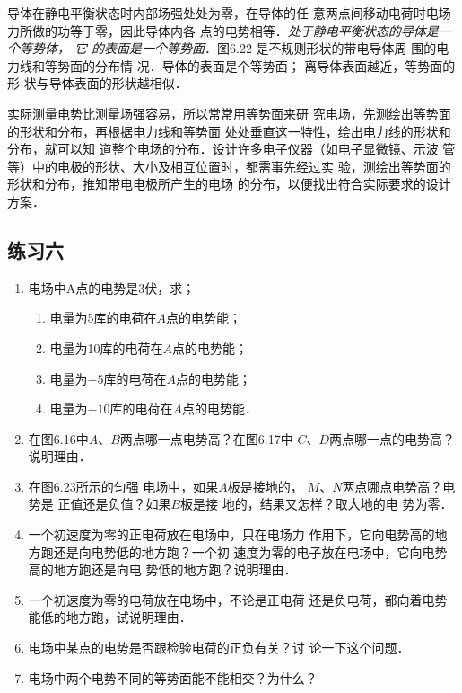 导体在静电平衡状态时内部场强处处为零，在导体的任
意两点间移动电荷时电场力所做的功等于零，因此导体内各
点的电势相等．\textit{处于静电平衡状态的导体是一个等势体，
它
的表面是一个等势面}．图6.22
是不规则形状的带电导体周
围的电力线和等势面的分布情
况．导体的表面是个等势面；
离导体表面越近，等势面的形
状与导体表面的形状越相似．

实际测量电势比测量场强容易，所以常常用等势面来研
究电场，先测绘出等势面的形状和分布，再根据电力线和等势面
处处垂直这一特性，绘出电力线的形状和分布，就可以知
道整个电场的分布．设计许多电子仪器（如电子显微镜、示波
管等）中的电极的形状、大小及相互位置时，都需事先经过实
验，测绘出等势面的形状和分布，推知带电电极所产生的电场
的分布，以便找出符合实际要求的设计方案．


\subsection*{练习六}

\begin{enumerate}
	\item 电场中A点的电势是3伏，求；
	\begin{enumerate}
		\item 电量为5库的电荷在$A$点的电势能；
		\item 电量为10库的电荷在$A$点的电势能；
		\item 电量为$-5$库的电荷在$A$点的电势能；
		\item 电量为$-10$库的电荷在$A$点的电势能．
	\end{enumerate}
	\item 在图6.16中$A$、$B$两点哪一点电势高？在图6.17中
$C$、$D$两点哪一点的电势高？说明理由．

\item 在图6.23所示的匀强
电场中，如果$A$板是接地的，
$M$、$N$两点哪点电势高？电势是
正值还是负值？如果$B$板是接
地的，结果又怎样？取大地的电
势为零．

\begin{figure}[htp]\centering
    \caption{}
\end{figure}	

\item 一个初速度为零的正电荷放在电场中，只在电场力
作用下，它向电势高的地方跑还是向电势低的地方跑？一个初
速度为零的电子放在电场中，它向电势高的地方跑还是向电
势低的地方跑？说明理由．
\item 一个初速度为零的电荷放在电场中，不论是正电荷
还是负电荷，都向着电势能低的地方跑，试说明理由．
\item 电场中某点的电势是否跟检验电荷的正负有关？讨
论一下这个问题．
\item 电场中两个电势不同的等势面能不能相交？为什么？
\end{enumerate}

